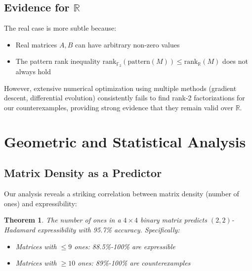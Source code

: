 \documentclass[11pt]{amsart}
\theoremstyle{plain}
\newtheorem{theorem}{Theorem}
\theoremstyle{definition}
\theoremstyle{remark}
\begin{document}
\subsection{Evidence for $\mathbb{R}$}

The real case is more subtle because:
\begin{itemize}
\item Real matrices $A, B$ can have arbitrary non-zero values
\item The pattern rank inequality $\mathrm{rank}_{\mathbb{F}_2}(\mathrm{pattern}(M)) \leq \mathrm{rank}_{\mathbb{R}}(M)$ does not always hold
\end{itemize}

However, extensive numerical optimization using multiple methods (gradient descent, differential evolution) consistently fails to find rank-2 factorizations for our counterexamples, providing strong evidence that they remain valid over $\mathbb{R}$.

\section{Geometric and Statistical Analysis}

\subsection{Matrix Density as a Predictor}

Our analysis reveals a striking correlation between matrix density (number of ones) and expressibility:

\begin{theorem}
The number of ones in a $4 \times 4$ binary matrix predicts $(2,2)$-Hadamard expressibility with 95.7\% accuracy. Specifically:
\begin{itemize}
\item Matrices with $\leq 9$ ones: 88.5\%-100\% are expressible
\item Matrices with $\geq 10$ ones: 89\%-100\% are counterexamples
\end{itemize}
\end{theorem}
\end{document}
